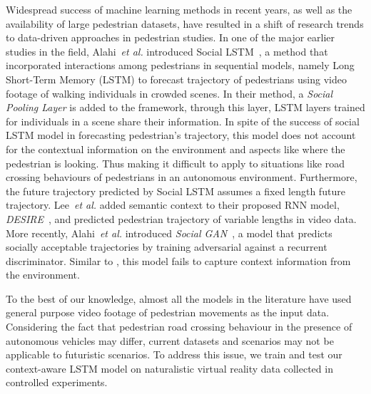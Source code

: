 Widespread success of machine learning methods in recent years, as well as the availability of large pedestrian datasets, have resulted in a shift of research trends to data-driven approaches in pedestrian studies. In one of the major earlier studies in the field, Alahi~\textit{et al.} introduced Social LSTM~\citep{alahi2016social}, a method that incorporated interactions among pedestrians in sequential models, namely Long Short-Term Memory (LSTM) to forecast trajectory of pedestrians using video footage of walking individuals in crowded scenes. In their method, a \textit{Social Pooling Layer} is added to the framework, through this layer, LSTM layers trained for individuals in a scene share their information. In spite of the success of social LSTM model in forecasting pedestrian's trajectory, this model does not account for the contextual information on the environment and aspects like where the pedestrian is looking. Thus making it difficult to apply to situations like road crossing behaviours of pedestrians in an autonomous environment. Furthermore, the future trajectory predicted by Social LSTM assumes a fixed length future trajectory. Lee~\textit{et al.} added semantic context to their proposed RNN model, \textit{DESIRE}~\citep{lee2017desire}, and predicted pedestrian trajectory of variable lengths in video data. More recently, Alahi~\textit{et al.} introduced \textit{Social GAN}~\citep{gupta2018social}, a model that predicts socially acceptable trajectories by training adversarial against a recurrent discriminator. Similar to \citep{alahi2016social}, this model fails to capture context information from the environment.

To the best of our knowledge, almost all the models in the literature have used general purpose video footage of pedestrian movements as the input data. Considering the fact that pedestrian road crossing behaviour in the presence of autonomous vehicles may differ, current datasets and scenarios may not be applicable to futuristic scenarios. To address this issue, we train and test our context-aware LSTM model on naturalistic virtual reality data collected in controlled experiments.     